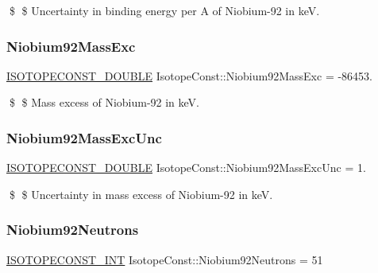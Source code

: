 \$ \$ Uncertainty in binding energy per A of Niobium-\/92 in keV. \mbox{\label{group___isotope_const-_niobium-_nb92_gae5d4e02b7dd29be2e12fdbabe18db7b6}} 
\subsubsection{\texorpdfstring{Niobium92\+Mass\+Exc}{Niobium92MassExc}}
{\footnotesize\ttfamily \mbox{\hyperlink{group___isotope_const-_macros_ga8f45a7272ce02c0b4c65c44636ed719a}{I\+S\+O\+T\+O\+P\+E\+C\+O\+N\+S\+T\+\_\+\+D\+O\+U\+B\+LE}} Isotope\+Const\+::\+Niobium92\+Mass\+Exc = -\/86453.}

\$ \$ Mass excess of Niobium-\/92 in keV. \mbox{\label{group___isotope_const-_niobium-_nb92_ga8323c37921056cf4e46fbcb8dea57509}} 
\subsubsection{\texorpdfstring{Niobium92\+Mass\+Exc\+Unc}{Niobium92MassExcUnc}}
{\footnotesize\ttfamily \mbox{\hyperlink{group___isotope_const-_macros_ga8f45a7272ce02c0b4c65c44636ed719a}{I\+S\+O\+T\+O\+P\+E\+C\+O\+N\+S\+T\+\_\+\+D\+O\+U\+B\+LE}} Isotope\+Const\+::\+Niobium92\+Mass\+Exc\+Unc = 1.}

\$ \$ Uncertainty in mass excess of Niobium-\/92 in keV. \mbox{\label{group___isotope_const-_niobium-_nb92_gae823fd6b9aed5c06fe87b787a26ea5b3}} 
\subsubsection{\texorpdfstring{Niobium92\+Neutrons}{Niobium92Neutrons}}
{\footnotesize\ttfamily \mbox{\hyperlink{group___isotope_const-_macros_ga5f18360b3e99483a35c32d789e62621c}{I\+S\+O\+T\+O\+P\+E\+C\+O\+N\+S\+T\+\_\+\+I\+NT}} Isotope\+Const\+::\+Niobium92\+Neutrons = 51}

